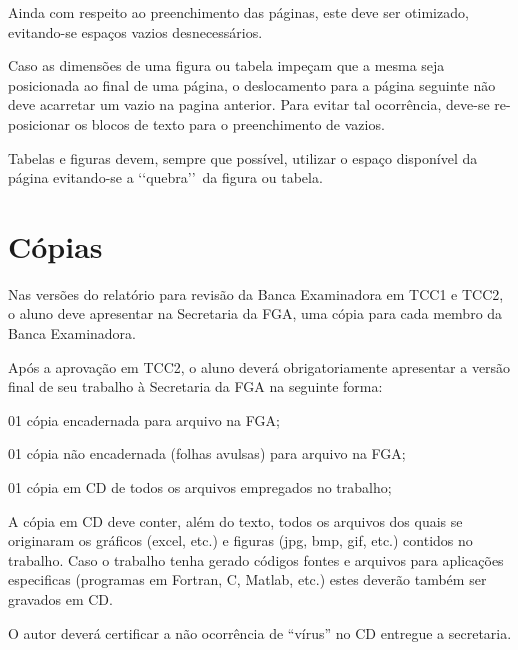 Ainda com respeito ao preenchimento das páginas, este deve ser otimizado, 
evitando-se espaços vazios desnecessários. 

Caso as dimensões de uma figura ou tabela impeçam que a mesma seja 
posicionada ao final de uma página, o deslocamento para a página seguinte 
não deve acarretar um vazio na pagina anterior. Para evitar tal ocorrência, 
deve-se re-posicionar os blocos de texto para o preenchimento de vazios. 

Tabelas e figuras devem, sempre que possível, utilizar o espaço disponível 
da página evitando-se a \lq\lq quebra\rq\rq\ da figura ou tabela. 

\section{Cópias}

Nas versões do relatório para revisão da Banca Examinadora em TCC1 e TCC2, 
o aluno deve apresentar na Secretaria da FGA, uma cópia para cada membro da 
Banca Examinadora.

Após a aprovação em TCC2, o aluno deverá obrigatoriamente apresentar a 
versão final de seu trabalho à Secretaria da FGA na seguinte forma:

\begin{description}
	\item 01 cópia encadernada para arquivo na FGA;
	\item 01 cópia não encadernada (folhas avulsas) para arquivo na FGA;
	\item 01 cópia em CD de todos os arquivos empregados no trabalho;
\end{description}

A cópia em CD deve conter, além do texto, todos os arquivos dos quais se 
originaram os gráficos (excel, etc.) e figuras (jpg, bmp, gif, etc.) 
contidos no trabalho. Caso o trabalho tenha gerado códigos fontes e 
arquivos para aplicações especificas (programas em Fortran, C, Matlab, 
etc.) estes deverão também ser gravados em CD. 

O autor deverá certificar a não ocorrência de “vírus” no CD entregue a 
secretaria. 


